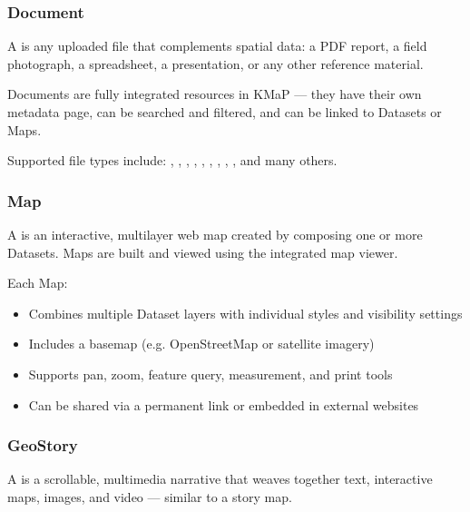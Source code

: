 \documentclass[letterpaper,10pt,english]{sphinxmanual}
\begin{document}
\subsubsection{Document}
\label{\detokenize{en/01_welcome:document}}
\sphinxAtStartPar
A  is any uploaded file that complements spatial data: a PDF report,
a field photograph, a spreadsheet, a presentation, or any other reference material.

\sphinxAtStartPar
Documents are fully integrated resources in KMaP — they have their own metadata page,
can be searched and filtered, and can be linked to Datasets or Maps.

\sphinxAtStartPar
Supported file types include: , , , , ,
, , , , and many others.


\subsubsection{Map}
\label{\detokenize{en/01_welcome:map}}
\sphinxAtStartPar
A  is an interactive, multi\sphinxhyphen{}layer web map created by composing one or more
Datasets. Maps are built and viewed using the integrated  map viewer.

\sphinxAtStartPar
Each Map:
\begin{itemize}
\item {} 
\sphinxAtStartPar
Combines multiple Dataset layers with individual styles and visibility settings

\item {} 
\sphinxAtStartPar
Includes a basemap (e.g. OpenStreetMap or satellite imagery)

\item {} 
\sphinxAtStartPar
Supports pan, zoom, feature query, measurement, and print tools

\item {} 
\sphinxAtStartPar
Can be shared via a permanent link or embedded in external websites

\end{itemize}


\subsubsection{GeoStory}
\label{\detokenize{en/01_welcome:geostory}}
\sphinxAtStartPar
A  is a scrollable, multimedia narrative that weaves together text,
interactive maps, images, and video — similar to a story map.
\end{document}
